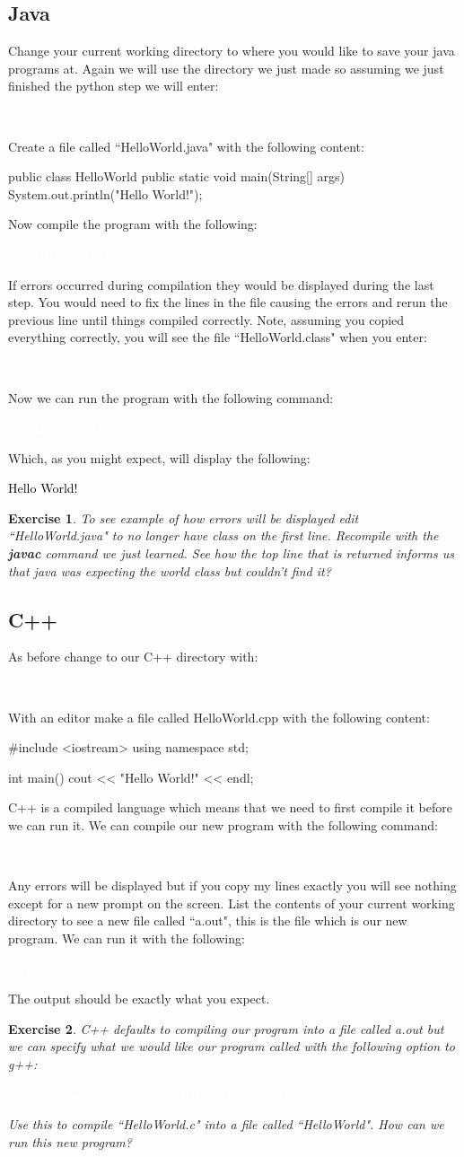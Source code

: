 \documentclass{book}
\newcommand{\commandline}[1]{\begin{center} \colorbox{Dark}{\textcolor{white}{#1}} \end{center}}
\newcommand{\exampleout}[1]{\begin{center} \colorbox{Light}{\textcolor{black}{#1}} \end{center}}
\newtheorem{ex}{Exercise}[chapter]
\begin{document}
\subsection{Java}
Change your current working directory to where you would like to save your java programs at. Again we will use the directory we just made so assuming we just finished the python step we will enter:
\commandline{cd ../Java}
Create a file called ``HelloWorld.java" with the following content:
\begin{verbatimtab}
    public class HelloWorld {
        public static void main(String[] args) {
            System.out.println("Hello World!");
        }
    }
\end{verbatimtab}
Now compile the program with the following:
\commandline{javac HelloWorld.java}
If errors occurred during compilation they would be displayed during the last step. You would need to fix the lines in the file causing the errors and rerun the previous line until things compiled correctly. Note, assuming you copied everything correctly, you will see the file ``HelloWorld.class" when you enter:
\commandline{ls}
Now we can run the program with the following command:
\commandline{java HelloWorld}
Which, as you might expect, will display the following:
\exampleout{Hello World!}
\begin{ex}
    To see example of how errors will be displayed edit ``HelloWorld.java" to no longer have class on the first line. Recompile with the \textbf{javac} command we just learned. See how the top line that is returned informs us that java was expecting the world class but couldn't find it?
\end{ex}

\subsection{C++}
As before change to our C++ directory with:
\commandline{cd ../C++}
With an editor make a file called HelloWorld.cpp with the following content:
\begin{verbatimtab}
    #include <iostream>
    using namespace std;
    
    int main() {
        cout << "Hello World!" << endl;
    }
\end{verbatimtab}
C++ is a compiled language which means that we need to first compile it before we can run it. We can compile our new program with the following command:
\commandline{g++ HelloWorld.cpp}
Any errors will be displayed but if you copy my lines exactly you will see nothing except for a new prompt on the screen. List the contents of your current working directory to see a new file called ``a.out", this is the file which is our new program. We can run it with the following:
\commandline{./a.out}
The output should be exactly what you expect. 
\begin{ex}
    C++ defaults to compiling our program into a file called a.out but we can specify what we would like our program called with the following option to g++:
    \commandline{g++ ourprogramfile.cpp -o whatIWantMyProgramToBeCalled}
    Use this to compile ``HelloWorld.c" into a file called ``HelloWorld". How can we run this new program?
\end{ex}
\end{document}
